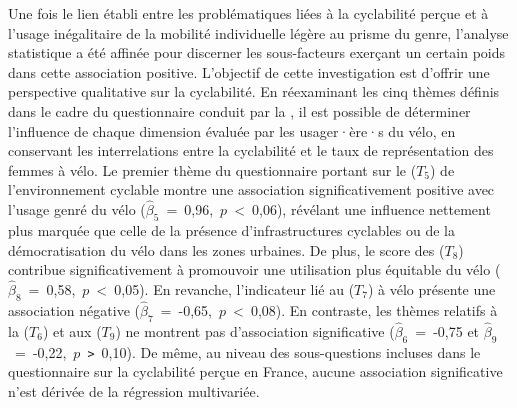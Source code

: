 \begin{refsegment}
Une fois le lien établi entre les problématiques liées à la cyclabilité perçue et à l'usage inégalitaire de la mobilité individuelle légère au prisme du genre, l'analyse statistique a été affinée pour discerner les sous-facteurs exerçant un certain poids dans cette association positive. L'objectif de cette investigation est d'offrir une perspective qualitative sur la cyclabilité. En réexaminant les cinq thèmes définis dans le cadre du questionnaire conduit par la \textcolor{blue}{\textcite{fub_barometre_2021}}, il est possible de déterminer l'influence de chaque dimension évaluée par les usager·ère·s du vélo, en conservant les interrelations entre la cyclabilité et le taux de représentation des femmes à vélo. Le premier thème du questionnaire portant sur le  (\(T_{5}\)) de l'environnement cyclable montre une association significativement positive avec l'usage genré du vélo ($\hat{\beta}_{5}$~=~0,96,~$p$~\textless~0,06), révélant une influence nettement plus marquée que celle de la présence d'infrastructures cyclables ou de la démocratisation du vélo dans les zones urbaines. De plus, le score des  (\(T_{8}\)) contribue significativement à promouvoir une utilisation plus équitable du vélo ($\hat{\beta}_{8}$~=~0,58,~$p$~\textless~0,05). En revanche, l'indicateur lié au  (\(T_{7}\)) à vélo présente une association négative ($\hat{\beta}_{7}$~=~-0,65,~$p$~\textless~0,08). En contraste, les thèmes relatifs à la  (\(T_{6}\)) et aux  (\(T_{9}\)) ne montrent pas d'association significative ($\hat{\beta}_{6}$~=~-0,75 et $\hat{\beta}_{9}$~=~-0,22,~$p$~\texttt{>}~0,10). De même, au niveau des sous-questions incluses dans le questionnaire sur la cyclabilité perçue en France, aucune association significative n'est dérivée de la régression multivariée.%


\end{refsegment}

